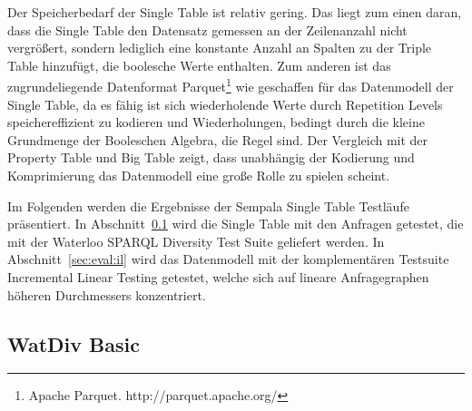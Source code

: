 \documentclass[
  a4paper,
  12pt,
  oneside,
  parskip=half,
  headsepline,
]{scrartcl}
\begin{document}
Der Speicherbedarf der Single Table ist relativ gering. Das liegt zum einen
daran, dass die Single Table den Datensatz gemessen an der Zeilenanzahl nicht
vergrößert, sondern lediglich eine konstante Anzahl an Spalten zu der Triple
Table hinzufügt, die boolesche Werte enthalten. Zum anderen ist das
zugrundeliegende Datenformat Parquet\footnote{Apache Parquet.
http://parquet.apache.org/} wie geschaffen für das Datenmodell der Single Table,
da es fähig ist sich wiederholende Werte durch Repetition Levels
speichereffizient zu kodieren \cite{dremel} und Wiederholungen, bedingt durch
die kleine Grundmenge der Booleschen Algebra, die Regel sind. Der Vergleich mit
der Property Table und Big Table zeigt, dass unabhängig der Kodierung und
Komprimierung das Datenmodell eine große Rolle zu spielen scheint.

Im Folgenden werden die Ergebnisse der Sempala Single Table Testläufe
präsentiert. In Abschnitt~\ref{sec:eval:basic} wird die Single Table mit den
Anfragen getestet, die mit der Waterloo SPARQL Diversity Test Suite geliefert
werden. In Abschnitt~\ref{sec:eval:il} wird das Datenmodell mit der
komplementären Testsuite Incremental Linear Testing getestet, welche sich auf 
lineare Anfragegraphen höheren Durchmessers konzentriert.

\subsection{WatDiv Basic}
\label{sec:eval:basic}
\end{document}
